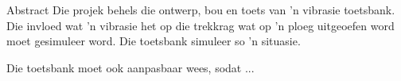 
\begin{Summary}{Abstract}
    Die projek behels die ontwerp, bou en toets van 'n vibrasie
    toetsbank. Die invloed wat 'n vibrasie het op die trekkrag wat op
   'n ploeg uitgeoefen word moet gesimuleer word. Die toetsbank
    simuleer so 'n situasie.

   Die toetsbank moet ook aanpasbaar wees, sodat ...
\end{Summary}

\endinput
